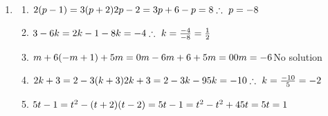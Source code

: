  \begin{eocsolutions}{}{
\begin{enumerate}[itemsep=7pt, label=\textbf{\arabic*}. ] 

 \item 
\begin{multicols}{2}
\begin{enumerate}[itemsep=6pt,label=\textbf{(\alph*)}]
\item $2(p-1) = 3(p+2)\\
2p-2=3p+6\\
-p=8\\
\therefore~p=-8\\$
\item $3-6k = 2k-1\\
-8k=-4\\
\therefore~k=\frac{-4}{-8} =\frac{1}{2}\\$

\item $m + 6(-m+1) + 5m = 0\\
m-6m+6+5m=0\\
0m=-6\\
$No solution
\item $2k + 3 = 2-3(k+3)
2k+3=2-3k-9\\
5k=-10\\
\therefore~k=\frac{-10}{5} = -2\\$
\item $5t-1=t^{2}-(t+2)(t-2)\\ = 5t-1=t^2-t^2+4\\ 5t=5\\ t=1$


\end{enumerate}
\end{multicols}
\end{enumerate}}
\end{eocsolutions}
